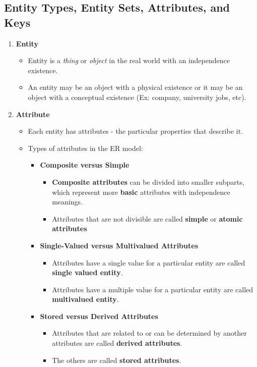 \documentclass[10pt]{article}
\begin{document}
\subsection{Entity Types, Entity Sets, Attributes, and Keys}
\begin{enumerate}
	\item \textbf{Entity}
	\begin{itemize}
		\item Entity is a \textit{thing} or \textit{object} in the real world with an independence existence.
		\item An entity may be an object with a physical existence or it may be an object with a conceptual existence (Ex: company, university jobs, etc).
	\end{itemize}

	\item \textbf{Attribute}
	\begin{itemize}
		\item Each entity has attributes - the particular properties that describe it.
		\item Types of attributes in the ER model:
		\begin{itemize}
			\item \textbf{Composite versus Simple}
			\begin{itemize}
				\item \textbf{Composite attributes} can be divided into smaller subparts, which represent more \textbf{basic} attributes with independence meanings.
				\item Attributes that are not divisible are called \textbf{simple} or \textbf{atomic attributes} 
			\end{itemize}

			\item \textbf{Single-Valued versus Multivalued Attributes}
			\begin{itemize}
				\item Attributes have a single value for a particular entity are called \textbf{single valued entity}.
				\item Attributes have a multiple value for a particular entity are called \textbf{multivalued entity}.
			\end{itemize}

			\item \textbf{Stored versus Derived Attributes}
			\begin{itemize}
				\item Attributes that are related to or can be determined by another attributes are called \textbf{derived attributes}.
				\item The others are called \textbf{stored attributes}.
			\end{itemize}


\end{itemize}
\end{itemize}
\end{enumerate}
\end{document}
